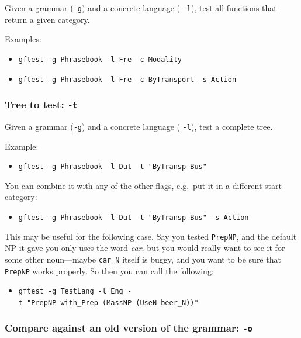 Given a grammar (\texttt{-g}) and a concrete language ( \texttt{-l}),
test all functions that return a given category.

Examples:

\begin{itemize}
\tightlist
\item
  \texttt{gftest\ -g\ Phrasebook\ -l\ Fre\ -c\ Modality}
\item
  \texttt{gftest\ -g\ Phrasebook\ -l\ Fre\ -c\ ByTransport\ -s\ Action}
\end{itemize}

\hypertarget{tree-to-test--t}{%
\subsubsection{\texorpdfstring{Tree to test:
\texttt{-t}}{Tree to test: -t}}\label{tree-to-test--t}}

Given a grammar (\texttt{-g}) and a concrete language ( \texttt{-l}),
test a complete tree.

Example:

\begin{itemize}
\tightlist
\item
  \texttt{gftest\ -g\ Phrasebook\ -l\ Dut\ -t\ "ByTransp\ Bus"}
\end{itemize}

You can combine it with any of the other flags, e.g.~put it in a
different start category:

\begin{itemize}
\tightlist
\item
  \texttt{gftest\ -g\ Phrasebook\ -l\ Dut\ -t\ "ByTransp\ Bus"\ -s\ Action}
\end{itemize}

This may be useful for the following case. Say you tested
\texttt{PrepNP}, and the default NP it gave you only uses the word
\emph{car}, but you would really want to see it for some other
noun---maybe \texttt{car\_N} itself is buggy, and you want to be sure
that \texttt{PrepNP} works properly. So then you can call the following:

\begin{itemize}
\tightlist
\item
  \texttt{gftest\ -g\ TestLang\ -l\ Eng\ -t\ "PrepNP\ with\_Prep\ (MassNP\ (UseN\ beer\_N))"}
\end{itemize}

\hypertarget{compare-against-an-old-version-of-the-grammar--o}{%
\subsubsection{\texorpdfstring{Compare against an old version of the
grammar:
\texttt{-o}}{Compare against an old version of the grammar: -o}}\label{compare-against-an-old-version-of-the-grammar--o}}

